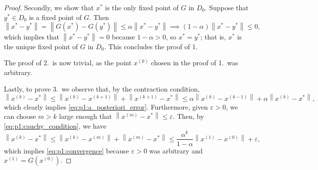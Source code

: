 \documentclass{homework}
\newcommand{\pow}[1]{^{\left(#1\right)}}
\newcommand{\norm}[1]{\left\lVert{#1}\right\rVert}
\begin{document}
\begin{proof}
		Secondly, we show that $x^*$ is the only fixed point of $G$ in $D_0$. Suppose that $y^* \in D_0$ is a fixed point of $G$. Then
		\begin{equation*}
			\norm{x^* - y^*} = \norm{G(x^*) - G(y^*)} \le \alpha\norm{x^* - y^*} \implies (1-\alpha)\norm{x^* - y^*} \le 0,
		\end{equation*}
		which implies that $\norm{x^* - y^*} = 0$ because $1-\alpha > 0$, so $x^* = y^*$; that is, $x^*$ is the unique fixed point of $G$ in $D_0$. This concludes the proof of 1.
		
		The proof of 2.\ is now trivial, as the point $x\pow{0}$ chosen in the proof of 1.\ was arbitrary.
		
		Lastly, to prove 3.\ we observe that, by the contraction condition,
		\begin{equation*}
			\norm{x\pow{k} - x^*} \le \norm{x\pow{k}-x\pow{k+1}} + \norm{x\pow{k+1}-x^*} \le \alpha\norm{x\pow{k} - x\pow{k-1}} + \alpha\norm{x\pow{k} - x^*},
		\end{equation*}
		which clearly implies \eqref{eq:p1:a_posteriori_error}. Furthermore, given $\varepsilon > 0$, we can choose $m>k$ large enough that $\norm{x\pow{m} - x^*} \le \varepsilon$. Then, by \eqref{eq:p1:cauchy_condition}, we have
		\begin{equation*}
			\norm{x\pow{k} - x^*} \le \norm{x\pow{k} - x\pow{m}} + \norm{x\pow{m} - x^*} \le \frac{\alpha^k}{1-\alpha}\norm{x\pow{1} - x\pow{0}} + \varepsilon,
		\end{equation*}
		which implies \eqref{eq:p1:convergence} because $\varepsilon > 0$ was arbitrary and $x\pow{1} =G\left(x\pow{0}\right)$.
	\end{proof}
	
\end{document}
